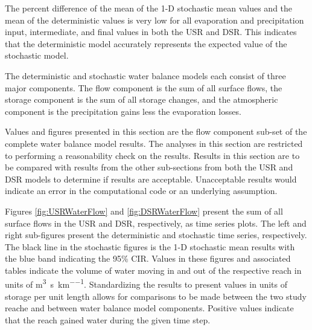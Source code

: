 \begin{linenumbers}
The percent difference of the mean of the 1-D stochastic mean values and the mean of the deterministic values is very low for all evaporation and precipitation input, intermediate, and final values in both the USR and DSR.  This indicates that the deterministic model accurately represents the expected value of the stochastic model.

The deterministic and stochastic water balance models each consist of three major components.  The flow component is the sum of all surface flows, the storage component is the sum of all storage changes, and the atmospheric component is the precipitation gains less the evaporation losses.

Values and figures presented in this section are the flow component sub-set of the complete water balance model results.  The analyses in this section are restricted to performing a reasonability check on the results.  Results in this section are to be compared with results from the other sub-sections from both the USR and DSR models to determine if results are acceptable.  Unacceptable results would indicate an error in the computational code or an underlying assumption.

Figures \ref{fig:USRWaterFlow} and \ref{fig:DSRWaterFlow} present the sum of all surface flows in the USR and DSR, respectively, as time series plots.  The left and right sub-figures present the deterministic and stochastic time series, respectively.  The black line in the stochastic figures is the 1-D stochastic mean results with the blue band indicating the 95\% CIR.  Values in these figures and associated tables indicate the volume of water moving in and out of the respective reach in units of \si{\cubic\meter\per\second\per\kilo\meter}.  Standardizing the results to present values in units of storage per unit length allows for comparisons to be made between the two study reache and between water balance model components.  Positive values indicate that the reach gained water during the given time step.


\end{linenumbers}
